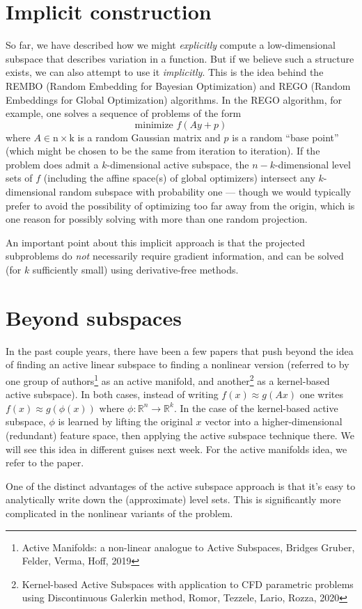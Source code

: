 \documentclass[12pt, leqno]{article} %
\begin{document}
\section{Implicit construction}

So far, we have described how we might {\em explicitly} compute a
low-dimensional subspace that describes variation in a function.  But
if we believe such a structure exists, we can also attempt to use it
{\em implicitly}.  This is the idea behind the REMBO (Random Embedding
for Bayesian Optimization) and REGO (Random Embeddings for Global
Optimization) algorithms.  In the REGO algorithm, for example, one
solves a sequence of problems of the form
\[
  \mbox{minimize } f(A y + p)
\]
where $A \in \mathrm{n \times k}$ is a random Gaussian matrix and $p$
is a random ``base point'' (which might be chosen to be the same from
iteration to iteration).  If the problem does admit a $k$-dimensional
active subspace, the $n-k$-dimensional level sets of $f$
(including the affine space(s) of global optimizers) intersect any
$k$-dimensional random subspace with probability one --- though we
would typically prefer to avoid the possibility of optimizing too far
away from the origin, which is one reason for possibly solving with
more than one random projection.

An important point about this implicit approach is that the projected
subproblems do {\em not} necessarily require gradient information,
and can be solved (for $k$ sufficiently small) using derivative-free methods.

\section{Beyond subspaces}

In the past couple years, there have been a few papers that push
beyond the idea of finding an active linear subspace to finding a
nonlinear version (referred to by one group of authors\footnote{Active
Manifolds: a non-linear analogue to Active Subspaces, Bridges Gruber,
Felder, Verma, Hoff, 2019} as an active manifold, and
another\footnote{Kernel-based Active Subspaces with application to CFD
parametric problems using Discontinuous Galerkin method, Romor,
Tezzele, Lario, Rozza, 2020} as a kernel-based active subspace).  In both
cases, instead of writing $f(x) \approx g(Ax)$ one writes
$f(x) \approx g(\phi(x))$ where
$\phi : \mathbb{R}^{n} \rightarrow \mathbb{R}^k$.  In the case of the
kernel-based active subspace, $\phi$ is learned by lifting the
original $x$ vector into a higher-dimensional (redundant) feature
space, then applying the active subspace technique there.  We will see
this idea in different guises next week.  For the active manifolds
idea, we refer to the paper.

One of the distinct advantages of the active subspace approach is that
it's easy to analytically write down the (approximate) level sets.
This is significantly more complicated in the nonlinear variants
of the problem.
\end{document}
